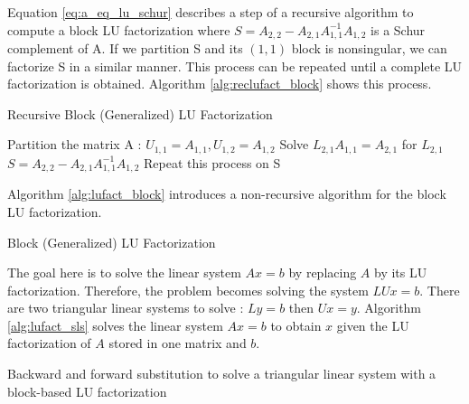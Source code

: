 Equation \ref{eq:a_eq_lu_schur} describes a step of a recursive algorithm to compute a block LU factorization where $S = A_{2,2} - A_{2,1}A_{1,1}^{-1}A_{1,2}$ is a Schur complement of A.
If we partition S and its $(1,1)$ block is nonsingular, we can factorize S in a similar manner.
This process can be repeated until a complete LU factorization is obtained.
Algorithm \ref{alg:reclufact_block} shows this process.


\begin{algorithm}[h]
	\DontPrintSemicolon
	\caption{Recursive Block (Generalized) LU Factorization\label{alg:reclufact_block}}
	Partition the matrix A : $U_{1,1} = A_{1,1},U_{1,2} = A_{1,2}$\;
	Solve $L_{2,1}A_{1,1} = A_{2,1}$ for $L_{2,1}$\;
	$S = A_{2,2} - A_{2,1}A_{1,1}^{-1}A_{1,2}$\;
	Repeat this process on S
\end{algorithm}

Algorithm \ref{alg:lufact_block} introduces a non-recursive algorithm for the block LU factorization.

\begin{algorithm}[h]
	\DontPrintSemicolon
	\caption{Block (Generalized) LU Factorization\label{alg:lufact_block}}
\end{algorithm}

The goal here is to solve the linear system $Ax = b$ by replacing $A$ by its LU factorization.
Therefore, the problem becomes solving the system $LUx=b$.
There are two triangular linear systems to solve : $Ly=b$ then $Ux=y$.
Algorithm \ref{alg:lufact_sls} solves the linear system $Ax = b$ to obtain $x$ given the LU factorization of $A$ stored in one matrix and $b$.

\begin{algorithm}[h]
	\DontPrintSemicolon
	\caption{Backward and forward substitution to solve a triangular linear system with a block-based LU factorization\label{alg:lufact_sls}}
	\;
\end{algorithm}

